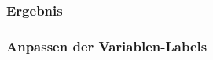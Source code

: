 \documentclass[12pt,ngerman]{beamer}
\begin{document}
\begin{frame}[plain]
\frametitle{Ergebnis}

\begin{center}
\end{center}
\end{frame}

\begin{frame}[fragile]
\frametitle{Anpassen der Variablen-Labels}



\end{frame}
\end{document}
